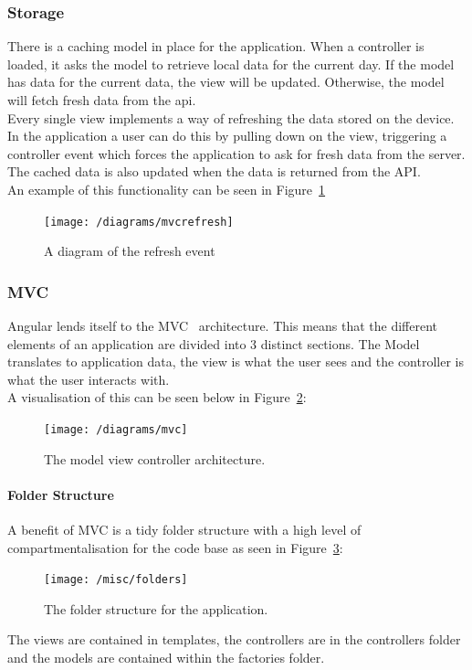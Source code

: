 \documentclass[draft,preprint,12pt,3p]{elsarticle}
\begin{document}
\subsubsection{Storage}
There is a caching model in place for the application. When a controller is loaded, it asks the model to retrieve local data for the current day. If the model has data for the current data, the view will be updated. Otherwise, the model will fetch fresh data from the api.\\
Every single view implements a way of refreshing the data stored on the device. In the application a user can do this by pulling down on the view, triggering a controller event which forces the application to ask for fresh data from the server. The cached data is also updated when the data is returned from the API.\\
An example of this functionality can be seen in Figure~\ref{fig:mvcrefresh}

\begin{figure}[H]
    \centering
    \texttt{[image: /diagrams/mvcrefresh]}
    \caption {A diagram of the refresh event}
    \label{fig:mvcrefresh}
\end{figure}


\subsubsection{MVC}
Angular lends itself to the MVC~\cite{mvc} architecture. This means that the different elements of an application are divided into 3 distinct sections. The Model translates to application data, the view is what the user sees and the controller is what the user interacts with.\\
A visualisation of this can be seen below in Figure~\ref{fig:mvcdiag}:
\begin{figure}[H]
    \centering
    \texttt{[image: /diagrams/mvc]}
    \caption {The model view controller architecture.~\cite{mvcimage}}
    \label{fig:mvcdiag}
\end{figure}

\paragraph{Folder Structure}
A benefit of MVC is a tidy folder structure with a high level of compartmentalisation for the code base as seen in Figure~\ref{fig:folderstruct}:

\begin{figure}[H]
    \centering
    \texttt{[image: /misc/folders]}
    \caption {The folder structure for the application.}
    \label{fig:folderstruct}
\end{figure}
The views are contained in templates, the controllers are in the controllers folder and the models are contained within the factories folder.\\
\end{document}
